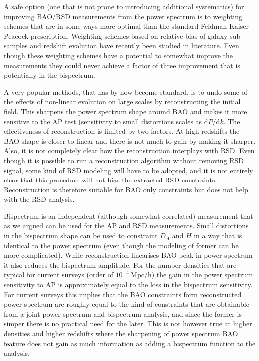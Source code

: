 A safe option (one that is not prone to introducing additional systematics) for
improving BAO/RSD measurements from the power spectrum is to weighting schemes
that are in some ways more optimal than the standard Feldman-Kaiser-Peacock
prescription. Weighting schemes based on relative bias of galaxy sub-samples and
redshift evolution have recently been studied in literature. Even though these
weighting schemes have a potential to somewhat improve the measurements they
could never achieve a factor of three improvement that is potentially in the
bispectrum.

A very popular methods, that has by now become standard, is to undo some of the
effects of non-linear evolution on large scales by reconstructing the initial
field. This sharpens the power spectrum shape around BAO and makes it more
sensitive to the AP test (sensitivity to small distortions scales as
$\mathrm{d}P/\mathrm{d}k$. The effectiveness of reconstruction is limited by
two factors. At high redshifts the BAO shape is closer to linear and there is
not much to gain by making it sharper. Also, it is not completely clear how the
reconstruction interplays with RSD. Even though it is possible to run a
reconstruction algorithm without removing RSD signal, some kind of RSD modeling
will have to be adopted, and it is not entirely clear that this procedure will
not bias the extracted RSD constraints. Reconstruction is therefore suitable
for BAO only constraints but does not help with the RSD analysis.

Bispectrum is an independent (although somewhat correlated) measurement that as
we argued can be used for the AP and RSD measurements. Small distortions in the
bispectrum shape can be used to constraint $D_A$ and $H$ in a way that is
identical to the power spectrum (even though the modeling of former can be more
complicated). While reconstruction linearises BAO peak in power spectrum it
also reduces the bispectrum amplitude. For the number densities that are
typical for current surveys (order of $10^{-4}\ \mathrm{Mpc}$/h) the gain in
the power spectrum sensitivity to AP is approximately equal to the loss in the
bispectrum sensitivity. For current surveys this implies that the BAO
constraints form reconstructed power spectrum are roughly equal to the kind of
constraints that are obtainable from a joint power spectrum and bispectrum
analysis, and since the former is simper there is no practical need for the
later. This is not however true at higher densities and higher redshifts where
the sharpening of power spectrum BAO feature does not gain as much information
as adding a bispectrum function to the analysis. 

